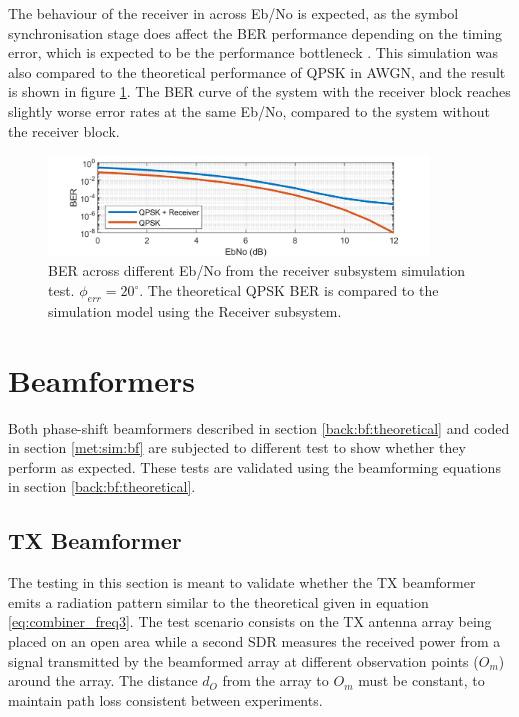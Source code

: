 \documentclass[12pt,a4paper]{report}
\begin{document}
The behaviour of the receiver in across Eb/No is expected, as the symbol synchronisation stage does affect the BER performance depending on the timing error, which is expected to be the performance bottleneck \cite{Mathworks2020SymbolSynchronization}. This simulation was also compared to the theoretical performance of QPSK in AWGN, and the result is shown in figure \ref{fig:test:rec:ber_snr}. The BER curve of the system with the receiver block reaches slightly worse error rates at the same Eb/No, compared to the system without the receiver block.

\begin{figure}[h]
    \centering
    \includegraphics[width = 0.9\textwidth]{Figures/BER_EbNo.png}
    \caption[BER of the receiver test.]{BER across different Eb/No from the receiver subsystem simulation test. $\phi_{err} = 20^\circ$. The theoretical QPSK BER is compared to the simulation model using the Receiver subsystem.}
    \label{fig:test:rec:ber_snr}
\end{figure}

\newpage
\section{Beamformers} \label{test:bf}
Both phase-shift beamformers described in section \ref{back:bf:theoretical} and coded in section \ref{met:sim:bf} are subjected to different test to show whether they perform as expected. These tests are validated using the beamforming equations in section \ref{back:bf:theoretical}. 

\subsection{TX Beamformer}\label{test:bf:tx}
The testing in this section is meant to validate whether the TX beamformer emits a radiation pattern similar to the theoretical given in equation \ref{eq:combiner_freq3}. The test scenario consists on the TX antenna array being placed on an open area while a second SDR measures the received power from a signal transmitted by the beamformed array at different observation points ($O_m$) around the array. The distance $d_O$ from the array to $O_m$ must be constant, to maintain path loss consistent between experiments.
\end{document}
